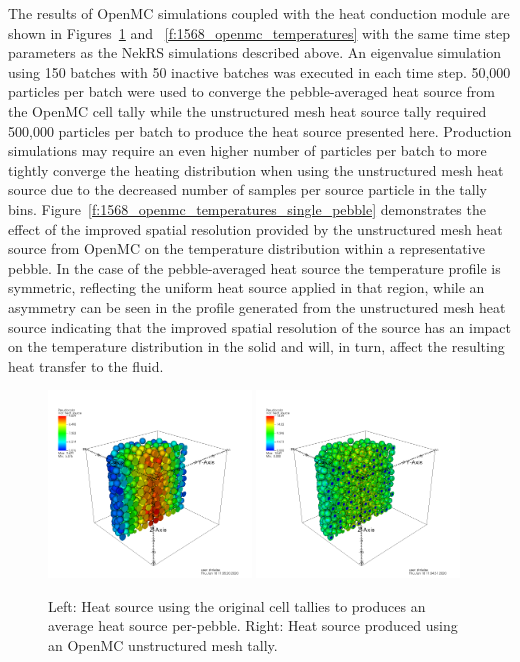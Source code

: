 The results of OpenMC simulations coupled with the heat conduction module are
shown in Figures~\ref{f:1568_openmc_heat_source} and
~\ref{f:1568_openmc_temperatures} with the same time step parameters as the
NekRS simulations described above. An eigenvalue simulation using 150 batches
with 50 inactive batches was executed in each time step. 50,000 particles per
batch were used to converge the pebble-averaged heat source from the OpenMC cell
tally while the unstructured mesh heat source tally required 500,000 particles
per batch to produce the heat source presented here. Production simulations may
require an even higher number of particles per batch to more tightly converge
the heating distribution when using the unstructured mesh heat source due to the
decreased number of samples per source particle in the tally bins.
Figure~\ref{f:1568_openmc_temperatures_single_pebble} demonstrates the effect of
the improved spatial resolution provided by the unstructured mesh heat source
from OpenMC on the temperature distribution within a representative pebble. In
the case of the pebble-averaged heat source the temperature profile is
symmetric, reflecting the uniform heat source applied in that region, while an
asymmetry can be seen in the profile generated from the unstructured mesh heat
source indicating that the improved spatial resolution of the source has an
impact on the temperature distribution in the solid and will, in turn, affect the
resulting heat transfer to the fluid.

\begin{figure}[!h]
\centering
\includegraphics[clip=true,width=0.48\textwidth]{Figures/openmc_cell_heat_source}
\includegraphics[clip=true,width=0.48\textwidth]{Figures/openmc_mesh_heat_source}
\caption{Left: Heat source using the original cell tallies to produces an average heat source per-pebble. Right: Heat source produced using an OpenMC unstructured mesh tally.}
\label{f:1568_openmc_heat_source}
\end{figure}

